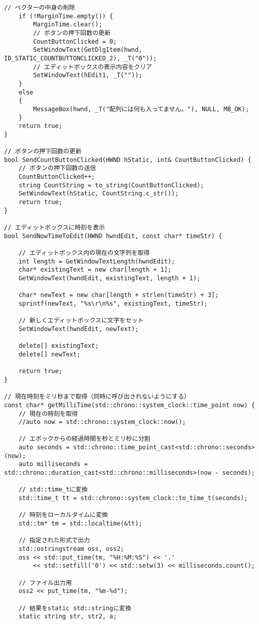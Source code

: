 \begin{lstlisting}[caption=main.cpp]
	// ベクターの中身の削除
	if (!MarginTime.empty()) {
		MarginTime.clear();
		// ボタンの押下回数の更新
		CountButtonClicked = 0;
		SetWindowText(GetDlgItem(hwnd, ID_STATIC_COUNTBUTTONCLICKED_2), _T("0"));
		// エディットボックスの表示内容をクリア
		SetWindowText(hEdit1, _T(""));
	}
	else
	{
		MessageBox(hwnd, _T("配列には何も入ってません。"), NULL, MB_OK);
	}
	return true;
}

// ボタンの押下回数の更新
bool SendCountButtonClicked(HWND hStatic, int& CountButtonClicked) {
	// ボタンの押下回数の送信
	CountButtonClicked++;
	string CountString = to_string(CountButtonClicked);
	SetWindowText(hStatic, CountString.c_str());
	return true;
}

// エディットボックスに時刻を表示
bool SendNowTimeToEdit(HWND hwndEdit, const char* timeStr) {

	// エディットボックス内の現在の文字列を取得
	int length = GetWindowTextLength(hwndEdit);
	char* existingText = new char[length + 1];
	GetWindowText(hwndEdit, existingText, length + 1);

	char* newText = new char[length + strlen(timeStr) + 3];
	sprintf(newText, "%s\r\n%s", existingText, timeStr);

	// 新しくエディットボックスに文字をセット
	SetWindowText(hwndEdit, newText);

	delete[] existingText;
	delete[] newText;

	return true;
}

// 現在時刻をミリ秒まで取得（同時に呼び出されないようにする）
const char* getMilliTime(std::chrono::system_clock::time_point now) {
	// 現在の時刻を取得
	//auto now = std::chrono::system_clock::now();

	// エポックからの経過時間を秒とミリ秒に分割
	auto seconds = std::chrono::time_point_cast<std::chrono::seconds>(now);
	auto milliseconds = std::chrono::duration_cast<std::chrono::milliseconds>(now - seconds);

	// std::time_tに変換
	std::time_t tt = std::chrono::system_clock::to_time_t(seconds);

	// 時刻をローカルタイムに変換
	std::tm* tm = std::localtime(&tt); 

	// 指定された形式で出力
	std::ostringstream oss, oss2;
	oss << std::put_time(tm, "%H:%M:%S") << '.'
		<< std::setfill('0') << std::setw(3) << milliseconds.count();

	// ファイル出力用
	oss2 << put_time(tm, "%m-%d");

	// 結果をstatic std::stringに変換
	static string str, str2, a;
	

\end{lstlisting}
